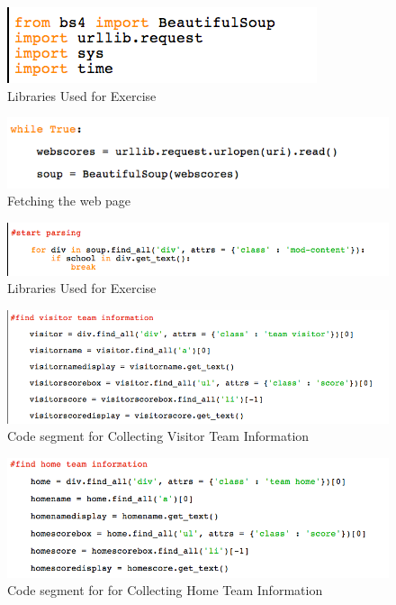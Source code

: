 \documentclass{article}
\begin{document}
\begin{figure}[H]
\centering
\includegraphics[scale=0.50]{libraries}
\caption{Libraries Used for Exercise}
\end{figure}

\begin{figure}[H]
\centering
\includegraphics[scale=0.50]{getpageandloop}
\caption{Fetching the web page}
\end{figure}

\begin{figure}[H]
\centering
\includegraphics[scale=0.50]{startparsing}
\caption{Libraries Used for Exercise}
\end{figure}

\begin{figure}[H]
\centering
\includegraphics[scale=0.40]{findvisitorteaminfo}
\caption{Code segment for Collecting Visitor Team Information}
\end{figure}

\begin{figure}[H]
\centering
\includegraphics[scale=0.40]{findhometeaminfo}
\caption{Code segment for for Collecting Home Team Information}
\end{figure}
\end{document}

